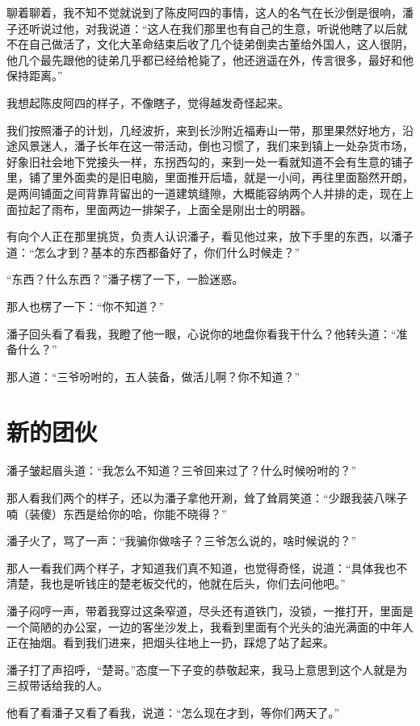 聊着聊着，我不知不觉就说到了陈皮阿四的事情，这人的名气在长沙倒是很响，潘子还听说过他，对我说道：“这人在我们那里也有自己的生意，听说他瞎了以后就不在自己做活了，文化大革命结束后收了几个徒弟倒卖古董给外国人，这人很阴，他几个最先跟他的徒弟几乎都已经给枪毙了，他还逍遥在外，传言很多，最好和他保持距离。”

我想起陈皮阿四的样子，不像瞎子，觉得越发奇怪起来。

我们按照潘子的计划，几经波折，来到长沙附近福寿山一带，那里果然好地方，沿途风景迷人，潘子长年在这一带活动，倒也习惯了，我们来到镇上一处杂货市场，好象旧社会地下党接头一样，东拐西勾的，来到一处一看就知道不会有生意的铺子里，铺了里外面卖的是旧电脑，里面推开后墙，就是一小间，再往里面豁然开朗，是两间铺面之间背靠背留出的一道建筑缝隙，大概能容纳两个人并排的走，现在上面拉起了雨布，里面两边一排架子，上面全是刚出士的明器。

有向个人正在那里挑货，负责人认识潘子，看见他过来，放下手里的东西，以潘子道：“怎么才到？基本的东西都备好了，你们什么时候走？”

“东西？什么东西？”潘子楞了一下，一脸迷惑。

那人也楞了一下：“你不知道？”

潘子回头看了看我，我瞪了他一眼，心说你的地盘你看我干什么？他转头道：“准备什么？”

那人道：“三爷吩咐的，五人装备，做活儿啊？你不知道？”

\chapter{新的团伙}

潘子皱起眉头道：“我怎么不知道？三爷回来过了？什么时候吩咐的？”

那人看我们两个的样子，还以为潘子拿他开涮，耸了耸肩笑道：“少跟我装八咪子喃（装傻）东西是给你的哈，你能不晓得？”

潘子火了，骂了一声：“我骗你做啥子？三爷怎么说的，啥时候说的？”

那人一看我们两个样子，才知道我们真不知道，也觉得奇怪，说道：“具体我也不清楚，我也是听钱庄的楚老板交代的，他就在后头，你们去问他吧。”

潘子闷哼一声，带着我穿过这条窄道，尽头还有道铁门，没锁，一推打开，里面是一个简陋的办公室，一边的客坐沙发上，我看到里面有个光头的油光满面的中年人正在抽烟。看到我们进来，把烟头往地上一扔，踩熄了站了起来。

潘子打了声招呼，“楚哥。”态度一下子变的恭敬起来，我马上意思到这个人就是为三叔带话给我的人。

他看了看潘子又看了看我，说道：“怎么现在才到，等你们两天了。”

